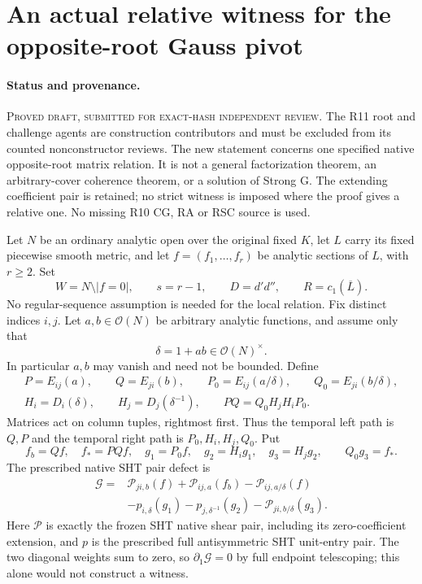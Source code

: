 \section{An actual relative witness for the opposite-root Gauss pivot}
\label{sec:r11-native-gauss-pivot}

\paragraph{Status and provenance.}
\textsc{Proved draft, submitted for exact-hash independent review.}
The R11 root and challenge agents are construction contributors and
must be excluded from its counted nonconstructor reviews.  The new
statement concerns one specified native opposite-root matrix relation.
It is not a general factorization theorem, an arbitrary-cover coherence
theorem, or a solution of Strong G.  The extending coefficient pair is
retained; no strict witness is imposed where the proof gives a relative
one.  No missing R10 CG, RA or RSC source is used.

Let $N$ be an ordinary analytic open over the original fixed $K$, let
$L$ carry its fixed piecewise smooth metric, and let
$f=(f_1,\ldots,f_r)$ be analytic sections of $L$, with $r\ge2$.
Set
\[
 W=N\setminus|f=0|,\qquad s=r-1,\qquad D=d'd'',\qquad
 R=c_1(\overline L).
 \tag{GPR1}
\]
No regular-sequence assumption is needed for the local relation.
Fix distinct indices $i,j$.  Let $a,b\in\mathcal O(N)$ be arbitrary
analytic functions, and assume only that
\[
                       \delta=1+ab\in\mathcal O(N)^\times.
 \tag{GPR2}
\]
In particular $a,b$ may vanish and need not be bounded.  Define
\[
 \begin{gathered}
 P=E_{ij}(a),\qquad Q=E_{ji}(b),\qquad
 P_0=E_{ij}(a/\delta),\qquad Q_0=E_{ji}(b/\delta),\\
 H_i=D_i(\delta),\qquad H_j=D_j(\delta^{-1}),
 \qquad PQ=Q_0H_jH_iP_0.
 \end{gathered}
 \tag{GPR3}
\]
Matrices act on column tuples, rightmost first.  Thus the temporal
left path is $Q,P$ and the temporal right path is $P_0,H_i,H_j,Q_0$.
Put
\[
 f_b=Qf,\quad f_*=PQf,\quad
 g_1=P_0f,\quad g_2=H_i g_1,\quad g_3=H_jg_2,
 \qquad Q_0g_3=f_*.
 \tag{GPR4}
\]
The prescribed native SHT pair defect is
\[
\begin{split}
 \mathscr G={}&\mathcal P_{ji,b}(f)+\mathcal P_{ij,a}(f_b)
 -\mathcal P_{ij,a/\delta}(f)\\
 &-p_{i,\delta}(g_1)-p_{j,\delta^{-1}}(g_2)
 -\mathcal P_{ji,b/\delta}(g_3).
\end{split}
\tag{GPR5}
\]
Here $\mathcal P$ is exactly the frozen SHT native shear pair,
including its zero-coefficient extension, and $p$ is the prescribed
full antisymmetric SHT unit-entry pair.  The two diagonal weights
sum to zero, so $\partial_1\mathscr G=0$ by full endpoint
telescoping; this alone would not construct a witness.

